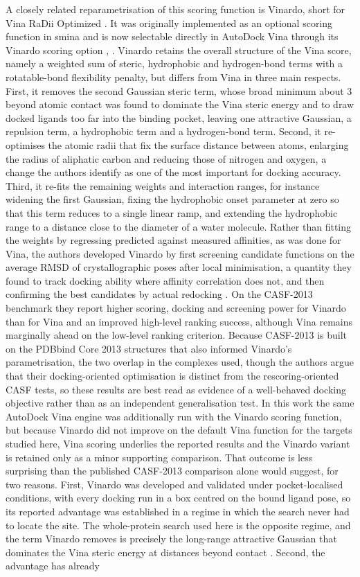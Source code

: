 A closely related reparametrisation of this scoring function is Vinardo, short for Vina RaDii Optimized \cite{ref073}. It was originally implemented as an optional scoring function in smina and is now selectable directly in AutoDock Vina through its Vinardo scoring option \cite{ref023}, \cite{ref073}. Vinardo retains the overall structure of the Vina score, namely a weighted sum of steric, hydrophobic and hydrogen-bond terms with a rotatable-bond flexibility penalty, but differs from Vina in three main respects. First, it removes the second Gaussian steric term, whose broad minimum about 3\angstrom{} beyond atomic contact was found to dominate the Vina steric energy and to draw docked ligands too far into the binding pocket, leaving one attractive Gaussian, a repulsion term, a hydrophobic term and a hydrogen-bond term. Second, it re-optimises the atomic radii that fix the surface distance between atoms, enlarging the radius of aliphatic carbon and reducing those of nitrogen and oxygen, a change the authors identify as one of the most important for docking accuracy. Third, it re-fits the remaining weights and interaction ranges, for instance widening the first Gaussian, fixing the hydrophobic onset parameter at zero so that this term reduces to a single linear ramp, and extending the hydrophobic range to a distance close to the diameter of a water molecule. Rather than fitting the weights by regressing predicted against measured affinities, as was done for Vina, the authors developed Vinardo by first screening candidate functions on the average RMSD of crystallographic poses after local minimisation, a quantity they found to track docking ability where affinity correlation does not, and then confirming the best candidates by actual redocking \cite{ref073}. On the CASF-2013 benchmark they report higher scoring, docking and screening power for Vinardo than for Vina and an improved high-level ranking success, although Vina remains marginally ahead on the low-level ranking criterion. Because CASF-2013 is built on the PDBbind Core 2013 structures that also informed Vinardo's parametrisation, the two overlap in the complexes used, though the authors argue that their docking-oriented optimisation is distinct from the rescoring-oriented CASF tests, so these results are best read as evidence of a well-behaved docking objective rather than as an independent generalisation test. In this work the same AutoDock Vina engine was additionally run with the Vinardo scoring function, but because Vinardo did not improve on the default Vina function for the targets studied here, Vina scoring underlies the reported results and the Vinardo variant is retained only as a minor supporting comparison. That outcome is less surprising than the published CASF-2013 comparison alone would suggest, for two reasons. First, Vinardo was developed and validated under pocket-localised conditions, with every docking run in a box centred on the bound ligand pose, so its reported advantage was established in a regime in which the search never had to locate the site. The whole-protein search used here is the opposite regime, and the term Vinardo removes is precisely the long-range attractive Gaussian that dominates the Vina steric energy at distances beyond contact \cite{ref073}. Second, the advantage has already 